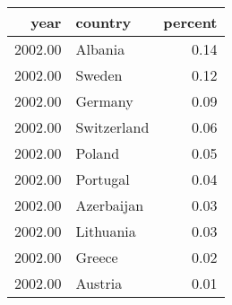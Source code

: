 \begin{table}[ht]
\centering
\begin{tabular}{rlr}
  \hline
year & country & percent \\ 
  \hline
2002.00 & Albania & 0.14 \\ 
  2002.00 & Sweden & 0.12 \\ 
  2002.00 & Germany & 0.09 \\ 
  2002.00 & Switzerland & 0.06 \\ 
  2002.00 & Poland & 0.05 \\ 
  2002.00 & Portugal & 0.04 \\ 
  2002.00 & Azerbaijan & 0.03 \\ 
  2002.00 & Lithuania & 0.03 \\ 
  2002.00 & Greece & 0.02 \\ 
  2002.00 & Austria & 0.01 \\ 
   \hline
\end{tabular}
\end{table}
